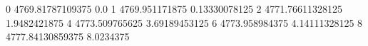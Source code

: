 0 4769.81787109375 0.0
1 4769.951171875 0.13330078125
2 4771.76611328125 1.9482421875
4 4773.509765625 3.69189453125
6 4773.958984375 4.14111328125
8 4777.84130859375 8.0234375
